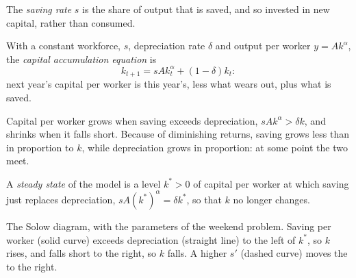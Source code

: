 \begin{definition}\label{def:g12:solow-first-look:saving-rate}
The \emph{saving rate} $s$ is the share of output that is saved, and so invested in new capital, rather than consumed.
\end{definition}

\begin{definition}\label{def:g12:solow-first-look:accumulation}
With a constant workforce,  $s$, depreciation rate $\delta$ and output per worker $y = Ak^{\alpha}$, the \emph{capital accumulation equation} is
\[ k_{t+1} = sAk_t^{\alpha} + (1 - \delta)k_t: \]
next year's capital per worker is this year's, less what wears out, plus what is saved.
\end{definition}

Capital per worker grows when saving exceeds depreciation, $sAk^{\alpha} > \delta k$, and shrinks when it falls short. Because of diminishing returns, saving grows
less than in proportion to $k$, while depreciation grows in proportion: at some point the two meet.

\begin{definition}\label{def:g12:solow-first-look:steady-state}
A \emph{steady state} of the model is a level $k^* > 0$ of capital per worker at which saving just replaces depreciation, $sA(k^*)^{\alpha} = \delta k^*$,
so that $k$ no longer changes.
\end{definition}

\begin{omfigure}

{\small The Solow diagram, with the parameters of the weekend problem. Saving per worker (solid curve) exceeds depreciation (straight line) to the left of $k^*$, so $k$ rises,
and falls short to the right, so $k$ falls. A higher  $s'$ (dashed curve) moves the  to the right.}
\end{omfigure}

